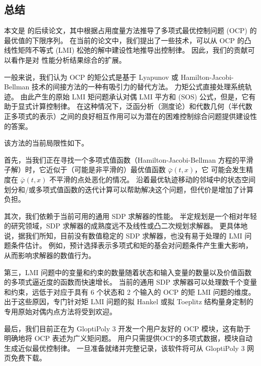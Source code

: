 \begin{translation}
\section{总结}

本文是 \cite{LasPriHen2005,LasHenPriTre2008} 的后续论文，其中根据占用度量方法推导了多项式最优控制问题 (OCP) 的最优值的下限序列。 在当前的论文中，我们提出了一些技术，可以从 OCP 的凸线性矩阵不等式 (LMI) 松弛的解中建设性地推导出控制律。 因此，我们的贡献可以看作是对 \cite{LasPriHen2005,LasHenPriTre2008} 性能分析结果综合的扩展。

一般来说，我们认为 OCP 的矩公式是基于 Lyapunov 或 Hamilton-Jacobi-Bellman 技术的间接方法的一种有吸引力的替代方法。 力矩公式直接处理系统轨迹。 由此产生的原始 LMI 矩问题承认对偶 LMI 平方和 (SOS) 公式，但是，它有助于显式计算控制律。 在这种情况下，泛函分析（测度论）和代数几何（半代数正多项式的表示）之间的良好相互作用可以为潜在的困难控制综合问题提供建设性的答案。

该方法的当前局限性如下。

首先，当我们正在寻找一个多项式值函数（Hamilton-Jacobi-Bellman 方程的平滑子解）时，它近似于（可能是非平滑的）最优值函数 $\bar{\varphi}(t,x)$，它 可能会发生精度在 $\bar{\varphi}(t,x)$ 不平滑的点处恶化的情况。 沿着最优轨迹移动的邻域中的状态空间划分和/或多项式值函数的迭代计算可以帮助解决这个问题，但代价是增加了计算负担。

其次，我们依赖于当前可用的通用 SDP 求解器的性能。 半定规划是一个相对年轻的研究领域，SDP 求解器的成熟度远不及线性或凸二次规划求解器。 更具体地说，据我们所知，目前没有数值稳定的 SDP 求解器，也没有易于处理的 LMI 问题条件估计。 例如，预计选择表示多项式和矩的基会对问题条件产生重大影响，从而影响求解器的数值行为。

第三，LMI 问题中的变量和约束的数量随着状态和输入变量的数量以及价值函数的多项式逼近度的函数而快速增长。 当前的通用 SDP 求解器可以处理数千个变量和约束，远低于对应于具有 6 个状态和 2 个输入的 OCP 的矩 LMI 问题的维度。 出于这些原因，专门针对矩 LMI 问题的拟 Hankel 或拟 Toeplitz 结构量身定制的专用原始对偶内点方法将受到欢迎。

最后，我们目前正在为 GloptiPoly 3 \cite{HenLasLof2007} 开发一个用户友好的 OCP 模块，这有助于明确地将 OCP 表述为广义矩问题。 用户只需提供OCP的多项式数据，模块自动生成近似最优控制律。 一旦准备就绪并完整记录，该软件将可从 GloptiPoly 3 网页免费下载。







\end{translation}
